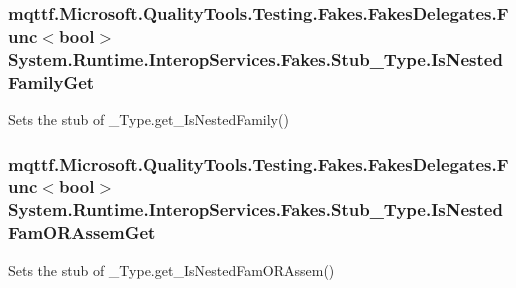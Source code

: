\hypertarget{class_system_1_1_runtime_1_1_interop_services_1_1_fakes_1_1_stub___type_a7c8484f38a04d407bd50e113b96d5428}{
\subsubsection[{Is\-Nested\-Family\-Get}]{\setlength{\rightskip}{0pt plus 5cm}mqttf.\-Microsoft.\-Quality\-Tools.\-Testing.\-Fakes.\-Fakes\-Delegates.\-Func$<$bool$>$ System.\-Runtime.\-Interop\-Services.\-Fakes.\-Stub\-\_\-\-Type.\-Is\-Nested\-Family\-Get}}\label{class_system_1_1_runtime_1_1_interop_services_1_1_fakes_1_1_stub___type_a7c8484f38a04d407bd50e113b96d5428}


Sets the stub of \-\_\-\-Type.\-get\-\_\-\-Is\-Nested\-Family()

\hypertarget{class_system_1_1_runtime_1_1_interop_services_1_1_fakes_1_1_stub___type_afd98811983291a41027a96eded0b9cc1}{
\subsubsection[{Is\-Nested\-Fam\-O\-R\-Assem\-Get}]{\setlength{\rightskip}{0pt plus 5cm}mqttf.\-Microsoft.\-Quality\-Tools.\-Testing.\-Fakes.\-Fakes\-Delegates.\-Func$<$bool$>$ System.\-Runtime.\-Interop\-Services.\-Fakes.\-Stub\-\_\-\-Type.\-Is\-Nested\-Fam\-O\-R\-Assem\-Get}}\label{class_system_1_1_runtime_1_1_interop_services_1_1_fakes_1_1_stub___type_afd98811983291a41027a96eded0b9cc1}


Sets the stub of \-\_\-\-Type.\-get\-\_\-\-Is\-Nested\-Fam\-O\-R\-Assem()

